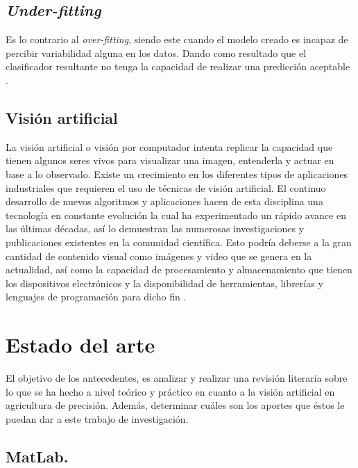 \section{\textit{Under-fitting}}

Es lo contrario al \textit{over-fitting}, siendo este cuando el modelo creado es incapaz de percibir variabilidad alguna en los datos. Dando como resultado que el clasificador resultante no tenga la capacidad de realizar una predicción aceptable \cite{jabbar2015methods}.

\section{Visión artificial} La visión artificial o visión por computador intenta replicar la capacidad que tienen algunos seres vivos para visualizar una imagen, entenderla y actuar en base a lo observado. Existe un crecimiento en los diferentes tipos de aplicaciones industriales que requieren el uso de técnicas de visión artificial. El  continuo  desarrollo  de  nuevos  algoritmos  y  aplicaciones  hacen  de  esta  disciplina  una tecnología en constante evolución la cual ha experimentado un rápido avance en las últimas décadas, así lo demuestran las numerosas investigaciones y publicaciones existentes en la comunidad científica.  Esto podría deberse a la gran cantidad de contenido visual como imágenes y video que se genera en  la  actualidad,  así  como  la  capacidad  de  procesamiento  y  almacenamiento  que  tienen  los dispositivos electrónicos y la disponibilidad de herramientas, librerías y lenguajes de programación para dicho fin \cite{ref_15}.






\chapter{Estado del arte}

	El objetivo de los antecedentes, es analizar y realizar una revisión literaria sobre lo  que  se  ha hecho  a  nivel  teórico  y  práctico  en  cuanto a  la visión artificial en agricultura de precisión.  Además,  determinar  cuáles son los aportes que éstos le puedan dar a este trabajo de investigación.


\section{MatLab.}

